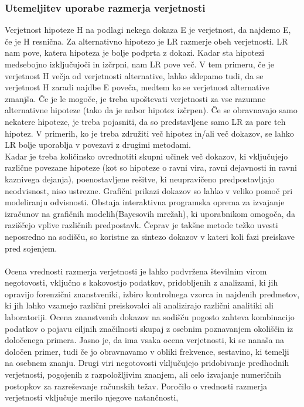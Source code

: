 \documentclass[12pt,a4paper]{amsart}
\theoremstyle{definition} %
\theoremstyle{plain} %
\begin{document}
\subsubsection{Utemeljitev uporabe razmerja verjetnosti}
Verjetnost hipoteze H na podlagi nekega dokaza E je verjetnost, da najdemo E, če je H resnična. Za alternativno hipotezo je LR razmerje obeh verjetnosti. LR nam pove, katera hipoteza je bolje podprta z dokazi. Kadar 
sta hipotezi medsebojno izključujoči in izčrpni, nam LR pove več. V tem primeru, če je verjetnost H večja od verjetnosti alternative, lahko sklepamo tudi, da se verjetnost H zaradi najdbe E poveča, medtem ko se 
verjetnost alternative zmanjša. Če je le mogoče, je treba upoštevati verjetnosti za vse razumne alternativne hipoteze (tako da je nabor hipotez izčrpen). Če se obravnavajo samo nekatere hipoteze, je treba pojasniti, 
da so predstavljene samo LR za pare teh hipotez. V primerih, ko je treba združiti več hipotez in/ali več dokazov, se lahko LR bolje uporablja v povezavi z drugimi metodami.\\
Kadar je treba količinsko ovrednotiti skupni učinek več dokazov, ki vključujejo različne povezane hipoteze (kot so hipoteze o ravni vira, ravni dejavnosti in ravni kaznivega dejanja), poenostavljene rešitve, ki 
neupravičeno predpostavljajo neodvisnost, niso ustrezne. Grafični prikazi dokazov so lahko v veliko pomoč pri modeliranju odvisnosti. Obstaja interaktivna programska oprema za izvajanje izračunov na grafičnih 
modelih(Bayesovih mrežah), ki uporabnikom omogoča, da raziščejo vplive različnih predpostavk. Čeprav je takšne metode težko uvesti neposredno na sodišču, so koristne za sintezo dokazov v kateri koli fazi preiskave pred sojenjem.\\\\
Ocena vrednosti razmerja verjetnosti je lahko podvržena številnim virom negotovosti, vključno s kakovostjo podatkov, pridobljenih z analizami, ki jih opravijo forenzični znanstveniki, izbiro kontrolnega 
vzorca in najdenih predmetov, ki jih lahko vzamejo različni preiskovalci ali analizirajo različni analitiki ali laboratoriji. Ocena znanstvenih dokazov na sodišču pogosto zahteva kombinacijo podatkov o pojavu ciljnih značilnosti 
skupaj z osebnim poznavanjem okoliščin iz določenega primera. Jasno je, da ima vsaka ocena verjetnosti, ki se nanaša na določen primer, tudi če jo obravnavamo v obliki frekvence, sestavino, ki temelji na osebnem znanju. Drugi viri 
negotovosti vključujejo pridobivanje predhodnih verjetnosti, pogojenih z razpoložljivim znanjem, ali celo izvajanje numeričnih postopkov za razreševanje računskih težav. Poročilo o vrednosti razmerja verjetnosti vključuje merilo njegove natančnosti, 
\end{document}
